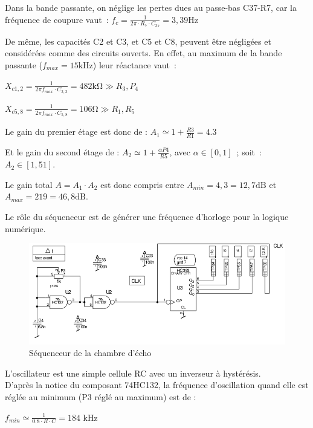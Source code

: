 \documentclass{article}
\begin{document}
Dans la bande passante, on néglige les pertes dues au passe-bas C37-R7, car la fréquence de coupure vaut~:
${f_c = \frac{1}{2 \pi \cdot R_7 \cdot C_{37}} = 3,39 \mathrm{Hz}}$

De même, les capacités C2 et C3, et C5 et C8, peuvent être négligées et considérées comme des circuits ouverts.
En effet, au maximum de la bande passante ($f_{max} = 15 \mathrm{kHz}$) leur réactance vaut~:
\begin{center}$X_{c1,2} = \frac{1}{2 \pi f_{max} \cdot C_{2,3}} = 482 \mathrm{k\Omega} \gg R_3, P_4 $\end{center}
\begin{center}$X_{c5,8} = \frac{1}{2 \pi f_{max} \cdot C_{5,8}} = 106 \mathrm{\Omega} \gg R_1, R_5 $\end{center}

Le gain du premier étage est donc de : $A_1 \simeq 1+\frac{R3}{R1} = 4.3 $

Et le gain du second étage de :
$A_2 \simeq 1+\frac{\alpha P4}{R5}$, avec $\alpha \in [0,1]$~; soit~: $A_2 \in [1,51]$.

Le gain total $A = A_1\cdot A_2$ est donc compris entre $A_{min} = 4,3 = 12,7 \mathrm{dB}$ et $A_{max} = 219 = 46,8 \mathrm{dB}$.


Le rôle du séquenceur est de générer une fréquence d'horloge pour la logique numérique.

\begin{figure}[h]
	\centering
	\includegraphics[width=.8\textwidth]{shema_sequenceur_1.png}
	\caption{Séquenceur de la chambre d'écho}
	\label{fig:seq}
\end{figure}

L'oscillateur est une simple cellule RC avec un inverseur à hystérésis.\\

D'après la notice du composant 74HC132, la fréquence d'oscillation quand elle est réglée au minimum (P3 réglé au maximum) est de :
\begin{center}
$f_{min} \simeq \frac{1}{0.8 \cdot R \cdot C} = 184 $ kHz
\end{center}
\end{document}
